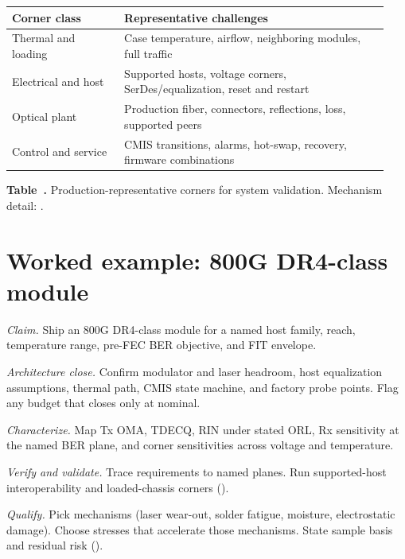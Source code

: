 \begin{table}[ht]
%
\centering
\setlength{\tabcolsep}{3pt}%
\footnotesize
\begin{tabular}{@{}p{0.28\linewidth}p{0.66\linewidth}@{}}
\toprule
Corner class & Representative challenges \\
\midrule
Thermal and loading & Case temperature, airflow, neighboring modules, full
traffic \\
\addlinespace[0.5em]
Electrical and host & Supported hosts, voltage corners, SerDes/equalization,
reset and restart \\
\addlinespace[0.5em]
Optical plant & Production fiber, connectors, reflections, loss, supported peers \\
\addlinespace[0.5em]
Control and service & CMIS transitions, alarms, hot-swap, recovery, firmware
combinations \\
\bottomrule
\end{tabular}
\par\medskip
{\raggedright\footnotesize\textbf{Table~\thetable.}\label{tab:prod-corners}
Production-representative corners for system validation. Mechanism detail:
.\par}
\end{table}


\section{Worked example: 800G DR4-class module}
\label{sec:productization-worked}

\textit{Claim.} Ship an 800G DR4-class module for a named host family, reach,
temperature range, pre-FEC BER objective, and FIT envelope.

\textit{Architecture close.} Confirm modulator and laser headroom, host
equalization assumptions, thermal path, CMIS state machine, and factory probe
points. Flag any budget that closes only at nominal.

\textit{Characterize.} Map Tx OMA, TDECQ, RIN under stated ORL, Rx sensitivity
at the named BER plane, and corner sensitivities across voltage and
temperature.

\textit{Verify and validate.} Trace requirements to named planes. Run
supported-host interoperability and loaded-chassis corners
().

\textit{Qualify.} Pick mechanisms (laser wear-out, solder fatigue, moisture,
electrostatic damage). Choose stresses that accelerate those mechanisms. State
sample basis and residual risk ().


